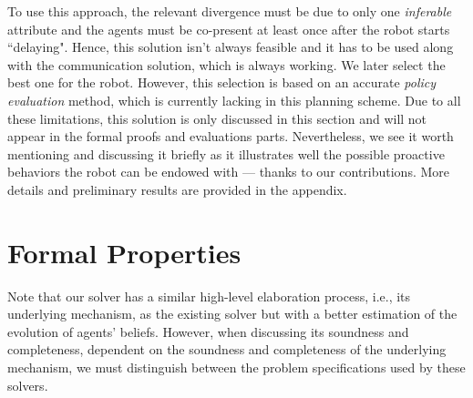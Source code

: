 \documentclass[letterpaper]{article} %
\begin{document}

To use this approach, the relevant divergence must be due to only one \textit{inferable} attribute and the agents must be co-present at least once after the robot starts ``delaying". 
Hence, this solution isn't always feasible and it has to be used along with the communication solution, which is always working.  We later select the best one for the robot. 
However, this selection is based on an accurate \textit{policy evaluation} method, which is currently lacking in this planning scheme.
Due to all these limitations, this solution is only discussed in this section and will not appear in the formal proofs and evaluations parts. 
Nevertheless, we see it worth mentioning and discussing it briefly as it illustrates well the possible proactive behaviors the robot can be endowed with --- thanks to our contributions. 
More details and preliminary results are provided in the appendix.




\section{Formal Properties} \label{sec:formal-props}
Note that our solver has a similar high-level elaboration process, i.e., its underlying mechanism, as the existing solver but with a better estimation of the evolution of agents' beliefs.  
However, when discussing its soundness and completeness, dependent on the soundness and completeness of the underlying mechanism, we must distinguish between the problem specifications used by these solvers. 
\end{document}
